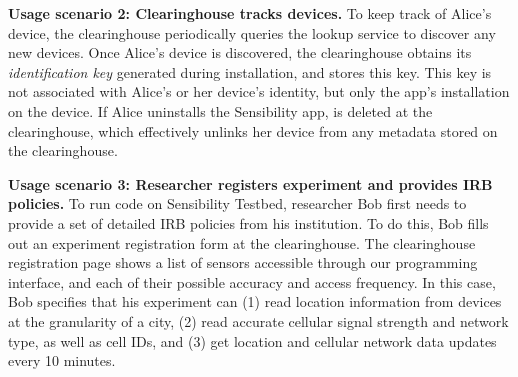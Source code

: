 \textbf{Usage scenario 2: Clearinghouse tracks devices.}
To keep track of Alice's device, the
clearinghouse periodically queries the lookup service to
discover any new devices. Once Alice's device is discovered, the
clearinghouse obtains its \textit{identification key}  generated
during installation, and stores this key. 
This key is not associated with Alice's or her
device's identity, but only the app's installation on the device. If
Alice uninstalls the Sensibility app,  is
deleted at the clearinghouse, which effectively unlinks
her device from any metadata stored on the clearinghouse.

\textbf{Usage scenario 3: Researcher registers experiment and provides IRB policies.}
To run code on Sensibility Testbed, researcher Bob first needs to 
provide a set of detailed IRB policies from his institution. 
To do this, Bob fills out an experiment
registration form  at the 
clearinghouse. The clearinghouse registration page shows 
a list of sensors accessible through our programming interface, and 
each of their possible accuracy 
and access frequency. In this case, Bob specifies that 
his experiment can (1) read location information
from devices at the granularity of a city, (2) read accurate
cellular signal strength and network type, as well as
cell IDs, and (3) get location and
cellular network data updates every 10 minutes. 
